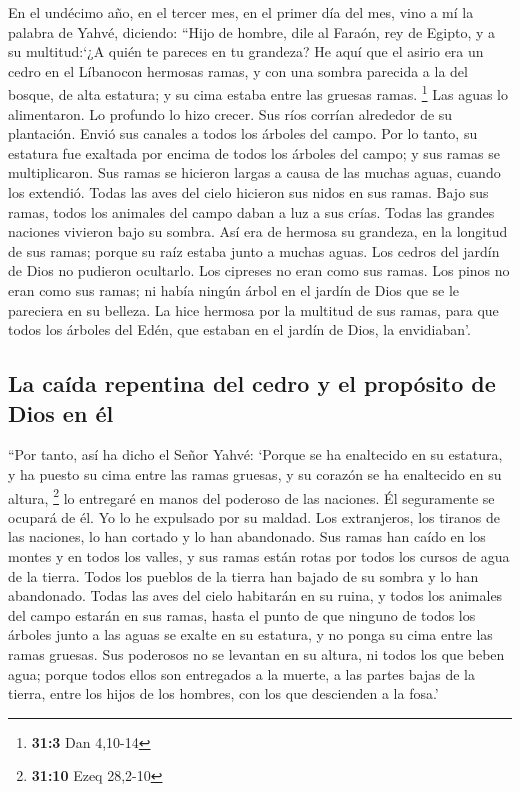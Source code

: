 \begin{paracol}{2}
 En el undécimo año, en el tercer mes, en el primer día
del mes, vino a mí la palabra de Yahvé, diciendo:  ``Hijo
de hombre, dile al Faraón, rey de Egipto, y a su multitud:`¿A quién te
pareces en tu grandeza?  He aquí que el asirio era un
cedro en el Líbanocon hermosas ramas, y con una sombra parecida a la del
bosque, de alta estatura; y su cima estaba entre las gruesas ramas.
\footnote{\textbf{31:3} Dan 4,10-14}  Las aguas lo
alimentaron. Lo profundo lo hizo crecer. Sus ríos corrían alrededor de
su plantación. Envió sus canales a todos los árboles del campo.
 Por lo tanto, su estatura fue exaltada por encima de
todos los árboles del campo; y sus ramas se multiplicaron. Sus ramas se
hicieron largas a causa de las muchas aguas, cuando los extendió.
 Todas las aves del cielo hicieron sus nidos en sus ramas.
Bajo sus ramas, todos los animales del campo daban a luz a sus crías.
Todas las grandes naciones vivieron bajo su sombra.  Así
era de hermosa su grandeza, en la longitud de sus ramas; porque su raíz
estaba junto a muchas aguas.  Los cedros del jardín de
Dios no pudieron ocultarlo. Los cipreses no eran como sus ramas. Los
pinos no eran como sus ramas; ni había ningún árbol en el jardín de Dios
que se le pareciera en su belleza.  La hice hermosa por la
multitud de sus ramas, para que todos los árboles del Edén, que estaban
en el jardín de Dios, la envidiaban'.

\hypertarget{la-cauxedda-repentina-del-cedro-y-el-propuxf3sito-de-dios-en-uxe9l}{%
\subsection{La caída repentina del cedro y el propósito de Dios en
él}\label{la-cauxedda-repentina-del-cedro-y-el-propuxf3sito-de-dios-en-uxe9l}}

 ``Por tanto, así ha dicho el Señor Yahvé: `Porque se ha
enaltecido en su estatura, y ha puesto su cima entre las ramas gruesas,
y su corazón se ha enaltecido en su altura, \footnote{\textbf{31:10}
  Ezeq 28,2-10}  lo entregaré en manos del poderoso de
las naciones. Él seguramente se ocupará de él. Yo lo he expulsado por su
maldad.  Los extranjeros, los tiranos de las naciones, lo
han cortado y lo han abandonado. Sus ramas han caído en los montes y en
todos los valles, y sus ramas están rotas por todos los cursos de agua
de la tierra. Todos los pueblos de la tierra han bajado de su sombra y
lo han abandonado.  Todas las aves del cielo habitarán en
su ruina, y todos los animales del campo estarán en sus ramas,
 hasta el punto de que ninguno de todos los árboles junto
a las aguas se exalte en su estatura, y no ponga su cima entre las ramas
gruesas. Sus poderosos no se levantan en su altura, ni todos los que
beben agua; porque todos ellos son entregados a la muerte, a las partes
bajas de la tierra, entre los hijos de los hombres, con los que
descienden a la fosa.'


\end{paracol}
